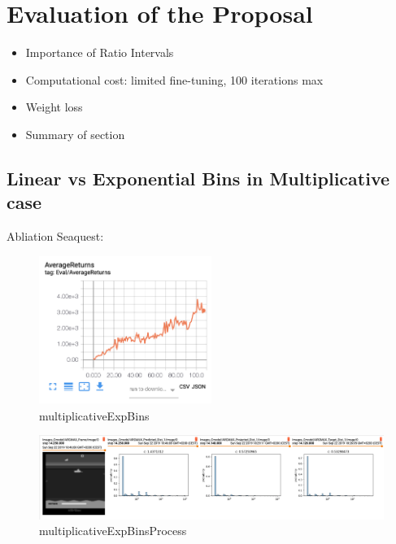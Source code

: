 \documentclass[12pt,a4paper,openright,twoside]{article}
\numberwithin{equation}{section}
\theoremstyle{definition}
\theoremstyle{remark}
\theoremstyle{plain}
\begin{document}
\newpage 
\thispagestyle{plain}
\section{Evaluation of the Proposal}

\begin{itemize}
	\item Importance of Ratio Intervals
	\item Computational cost: limited fine-tuning, 100 iterations max
	\item Weight loss
	\item Summary of section
\end{itemize}




\subsection*{Linear vs Exponential Bins in Multiplicative case}

Abliation Seaquest:

\begin{figure}[h]
    \centering
    \includegraphics[width=0.5\textwidth]{multiplicativeExpBins}
    \caption{multiplicativeExpBins}
    \label{fig:multiplicativeExpBins}
\end{figure}

\begin{figure}[h]
    \centering
    \includegraphics[width=\textwidth]{multiplicativeExpBinsProcess}
    \caption{multiplicativeExpBinsProcess}
    \label{fig:multiplicativeExpBinsProcess}
\end{figure}
\end{document}
